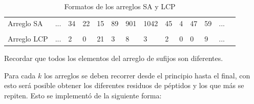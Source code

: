 \begin{table}[h]
\centering
\label{my-label15}
\begin{tabular}{llllllllllllll}
\cline{2-13}
\multicolumn{1}{l|}{Arreglo SA}  & \multicolumn{1}{l|}{...} & \multicolumn{1}{l|}{34} & \multicolumn{1}{l|}{22} & \multicolumn{1}{l|}{15} & \multicolumn{1}{l|}{89} & \multicolumn{1}{l|}{901} & \multicolumn{1}{l|}{1042} & \multicolumn{1}{l|}{45} & \multicolumn{1}{l|}{4} & \multicolumn{1}{l|}{47} & \multicolumn{1}{l|}{59} & \multicolumn{1}{l|}{...} &  \\ \cline{2-13}
                                 &                          &                         &                         &                         &                         &                          &                           &                         &                        &                         &                         &                          &  \\ \cline{2-13}
\multicolumn{1}{l|}{Arreglo LCP} & \multicolumn{1}{l|}{...} & \multicolumn{1}{l|}{2}  & \multicolumn{1}{l|}{0}  & \multicolumn{1}{l|}{21} & \multicolumn{1}{l|}{3}  & \multicolumn{1}{l|}{8}   & \multicolumn{1}{l|}{3}    & \multicolumn{1}{l|}{2}  & \multicolumn{1}{l|}{0} & \multicolumn{1}{l|}{0}  & \multicolumn{1}{l|}{9}  & \multicolumn{1}{l|}{...} &  \\ \cline{2-13}
\end{tabular}
\caption{Formatos de los arreglos SA y LCP}
\end{table}

Recordar que todos los elementos del arreglo de sufijos son diferentes.

Para cada $k$ los arreglos se deben recorrer desde el principio hasta el final, con esto será posible obtener los diferentes residuos de péptidos y los que más se repiten. Esto se implementó de la siguiente forma:

